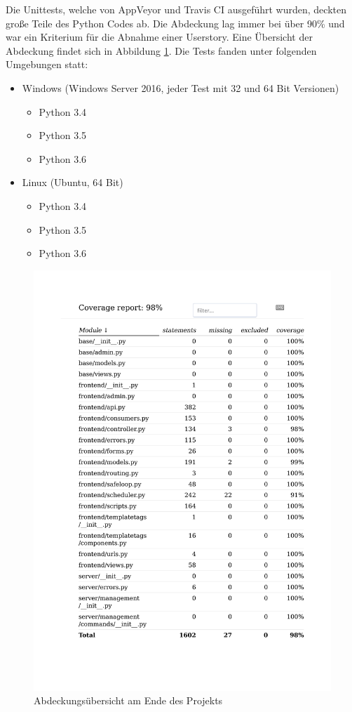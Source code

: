 \documentclass[accentcolor=tud9c,12pt,paper=a4]{tudreport}
\begin{document}
	Die Unittests, welche von AppVeyor und Travis CI ausgeführt wurden, deckten große Teile des Python Codes ab.
	Die Abdeckung lag immer bei über 90\% und war ein Kriterium für die Abnahme einer Userstory. Eine Übersicht der Abdeckung
	findet sich in Abbildung \ref{coverage_pdf}.
	Die Tests fanden unter folgenden Umgebungen statt:
	\begin{itemize}
		\item Windows (Windows Server 2016, jeder Test mit 32 und 64 Bit Versionen)
			\begin{itemize}
				\item Python 3.4
				\item Python 3.5
				\item Python 3.6
			\end{itemize}
		\item Linux (Ubuntu, 64 Bit)
			\begin{itemize}
				\item Python 3.4
				\item Python 3.5
				\item Python 3.6
			\end{itemize}
	\end{itemize}
	\begin{figure}[t]
		\centering
	\includegraphics[width=.8\textwidth]{img/coverage.pdf}
		\caption{Abdeckungsübersicht am Ende des Projekts}
		\label{coverage_pdf}
	\end{figure}
\end{document}
